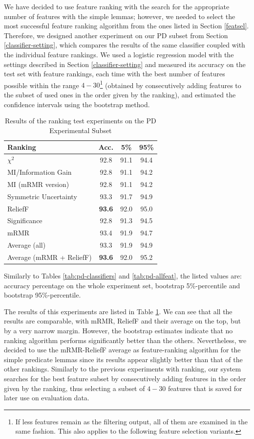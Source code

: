 \documentclass[12pt,notitlepage]{report}
\begin{document}
We have decided to use feature ranking with the search for the appropriate number of features with the simple lemmas; however, we needed to select the most successful feature ranking algorithm from the ones listed in Section \ref{featsel}. Therefore, we designed another experiment on our PD subset from Section \ref{classifier-setting}, which compares the results of the same classifier coupled with the individual feature rankings. We used a logistic regression model with the settings described in Section \ref{classifier-setting} and measured its accuracy on the test set with feature rankings, each time with the best number of features possible within the range $4-30$\footnote{If less features remain as the filtering output, all of them are examined in the same fashion. This also applies to the following feature selection variants.} (obtained by consecutively adding features to the subset of used ones in the order given by the ranking), and estimated the confidence intervals using the bootstrap method. 

\begin{table}[htpb]
\caption{Results of the ranking test experiments on the PD Experimental Subset}\label{tab:ranker-test}\footnotesize
\begin{center}
\begin{tabular}{|l|c|c|c|}\hline
\bf Ranking & \bf Acc. & \bf 5\% & \bf 95\% \\\hline
$\chi^2$ & 92.8 & 91.1 & 94.4 \\
MI/Information Gain & 92.8 & 91.1 & 94.2 \\
MI (mRMR version) & 92.8 & 91.1 & 94.2 \\
Symmetric Uncertainty & 93.3 & 91.7 & 94.9 \\
ReliefF & \bf 93.6 & 92.0 & 95.0 \\
Significance & 92.8 & 91.3 & 94.5 \\
mRMR & 93.4 & 91.9 & 94.7 \\
Average (all) & 93.3 & 91.9 & 94.9 \\
Average (mRMR + ReliefF) & \bf 93.6 & 92.0 & 95.2 \\\hline
\end{tabular}
\end{center}
Similarly to Tables \ref{tab:pd-classifiers} and \ref{tab:pd-allfeat}, the listed values are: accuracy percentage on the whole experiment set, bootstrap 5\%-percentile and bootstrap 95\%-percentile. 
\end{table}

The results of this experiments are listed in Table \ref{tab:ranker-test}. We can see that all the results are comparable, with mRMR, ReliefF and their average on the top, but by a very narrow margin. However, the bootstrap estimates indicate that no ranking algorithm performs significantly better than the others. Nevertheless, we decided to use the mRMR-ReliefF average as feature-ranking algorithm for the simple predicate lemmas since its results appear slightly better than that of the other rankings. Similarly to the previous experiments with ranking, our system searches for the best feature subset by consecutively adding features in the order given by the ranking, thus selecting a subset of $4-30$ features that is saved for later use on evaluation data.
\end{document}

